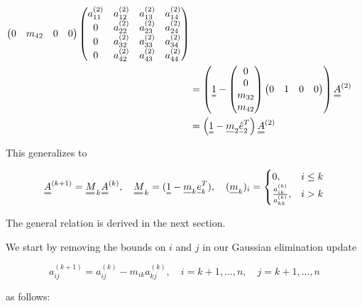 \begin{equation}
\begin{aligned}
\begin{pmatrix}
    0 & m_{42} & 0 & 0
    \end{pmatrix}
    \begin{pmatrix}
    a_{11}^{(2)} & a_{12}^{(2)} & a_{13}^{(2)} & a_{14}^{(2)} \\
    0            & a_{22}^{(2)} & a_{23}^{(2)} & a_{24}^{(2)} \\
    0            & a_{32}^{(2)} & a_{33}^{(2)} & a_{34}^{(2)} \\
    0            & a_{42}^{(2)} & a_{43}^{(2)} & a_{44}^{(2)}
    \end{pmatrix} \\
    &=
    \left( \mat{1} - \begin{pmatrix}
        0 \\ 0 \\ m_{32} \\ m_{42}
    \end{pmatrix} \begin{pmatrix}
        0 & 1 & 0 & 0
    \end{pmatrix} \right) \mat{A}^{(2)} \\
    &=
    \left( \mat{1} - \vec{m}_2 \vec{\hat{e}}_2^T \right) \mat{A}^{(2)}
    \end{aligned}
\end{equation}

This generalizes to

\begin{equation}
    \mat{A}^{(k+1)} = \mat{M}_k \mat{A}^{(k)}, \quad \mat{M}_k = (\mat{1} - \vec{m}_k \vec{e}_k^T), \quad (\vec{m}_k)_i = \begin{cases}
                0, &i \leq k \\
                \frac{a^{(k)}_{ik}}{a^{(k)}_{kk}}, &i>k
            \end{cases}
\end{equation}

The general relation is derived in the next section.


We start by removing the bounds on $i$ and $j$ 
in our Gaussian elimination update

\begin{equation}
    a_{i j}^{(k+1)}=a_{i j}^{(k)}-m_{i k} a_{k j}^{(k)}, \quad i=k+1, ..., n, \quad j=k+1, ..., n
\end{equation}

as follows:

